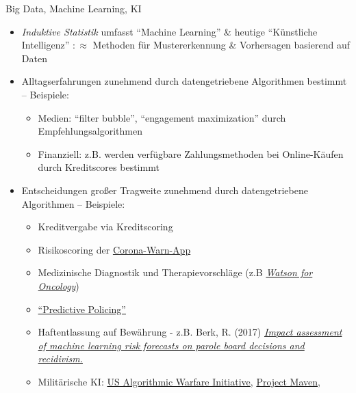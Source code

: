 \documentclass[
  10pt,
  ignorenonframetext,
]{beamer}
\providecommand{\tightlist}{%
  \setlength{\itemsep}{0pt}\setlength{\parskip}{0pt}}
\begin{document}
\begin{frame}{Big Data, Machine Learning, KI}
\label{big-data-machine-learning-ki}
\begin{itemize}
\item
  \emph{Induktive Statistik} umfasst ``Machine Learning'' \& heutige
  ``Künstliche Intelligenz'' \(:\approx\) Methoden für Mustererkennung
  \& Vorhersagen basierend auf Daten
\item
  Alltagserfahrungen zunehmend durch datengetriebene Algorithmen
  bestimmt -- Beispiele:

  \begin{itemize}
  \tightlist
  \item
    Medien: ``filter bubble'', ``engagement maximization'' durch
    Empfehlungsalgorithmen
  \item
    Finanziell: z.B. werden verfügbare Zahlungsmethoden bei
    Online-Käufen durch Kreditscores bestimmt
  \end{itemize}
\item
  Entscheidungen großer Tragweite zunehmend durch datengetriebene
  Algorithmen -- Beispiele:

  \begin{itemize}
  \tightlist
  \item
    Kreditvergabe via Kreditscoring
  \item
    Risikoscoring der
    \href{https://github.com/corona-warn-app/cwa-documentation/blob/master/transmission_risk.pdf}{Corona-Warn-App}
  \item
    Medizinische Diagnostik und Therapievorschläge (z.B
    \href{https://www.nature.com/articles/s41598-021-84973-5}{\emph{Watson
    for Oncology}})
  \item
    \href{https://projects.tampabay.com/projects/2020/investigations/police-pasco-sheriff-targeted/intelligence-led-policing/}{``Predictive
    Policing''}
  \item
    Haftentlassung auf Bewährung - z.B. Berk, R. (2017)
    \href{https://doi.org/10.1007/s11292-017-9286-2}{\emph{Impact
    assessment of machine learning risk forecasts on parole board
    decisions and recidivism.}}
  \item
    Militärische KI:
    \href{https://venturebeat.com/2019/11/08/the-u-s-military-algorithmic-warfare-and-big-tech/}{US
    Algorithmic Warfare Initiative},
    \href{https://theintercept.com/2018/03/06/google-is-quietly-providing-ai-technology-for-drone-strike-targeting-project/}{Project
    Maven},
  \end{itemize}
\end{itemize}
\end{frame}
\end{document}
